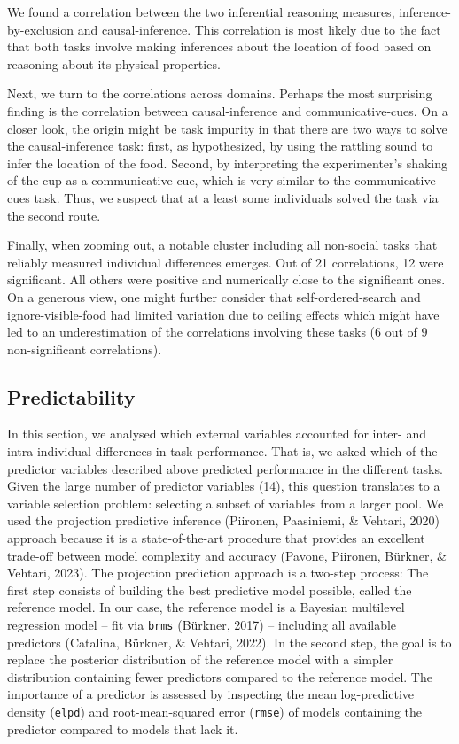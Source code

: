 \documentclass[
  man,floatsintext]{apa6}
\begin{document}
We found a correlation between the two inferential reasoning measures, inference-by-exclusion and causal-inference. This correlation is most likely due to the fact that both tasks involve making inferences about the location of food based on reasoning about its physical properties.

Next, we turn to the correlations across domains. Perhaps the most surprising finding is the correlation between causal-inference and communicative-cues. On a closer look, the origin might be task impurity in that there are two ways to solve the causal-inference task: first, as hypothesized, by using the rattling sound to infer the location of the food. Second, by interpreting the experimenter's shaking of the cup as a communicative cue, which is very similar to the communicative-cues task. Thus, we suspect that at a least some individuals solved the task via the second route.

Finally, when zooming out, a notable cluster including all non-social tasks that reliably measured individual differences emerges. Out of 21 correlations, 12 were significant. All others were positive and numerically close to the significant ones. On a generous view, one might further consider that self-ordered-search and ignore-visible-food had limited variation due to ceiling effects which might have led to an underestimation of the correlations involving these tasks (6 out of 9 non-significant correlations).

\subsection{Predictability}\label{predictability}

In this section, we analysed which external variables accounted for inter- and intra-individual differences in task performance. That is, we asked which of the predictor variables described above predicted performance in the different tasks. Given the large number of predictor variables (14), this question translates to a variable selection problem: selecting a subset of variables from a larger pool. We used the projection predictive inference (Piironen, Paasiniemi, \& Vehtari, 2020) approach because it is a state-of-the-art procedure that provides an excellent trade-off between model complexity and accuracy (Pavone, Piironen, Bürkner, \& Vehtari, 2023). The projection prediction approach is a two-step process: The first step consists of building the best predictive model possible, called the reference model. In our case, the reference model is a Bayesian multilevel regression model -- fit via \texttt{brms} (Bürkner, 2017) -- including all available predictors (Catalina, Bürkner, \& Vehtari, 2022). In the second step, the goal is to replace the posterior distribution of the reference model with a simpler distribution containing fewer predictors compared to the reference model. The importance of a predictor is assessed by inspecting the mean log-predictive density (\texttt{elpd}) and root-mean-squared error (\texttt{rmse}) of models containing the predictor compared to models that lack it.
\end{document}
